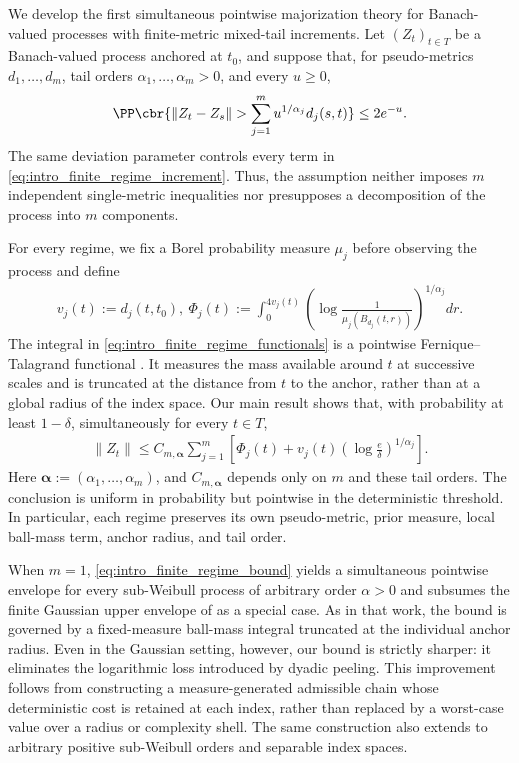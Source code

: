 \documentclass[11pt]{article}
\begin{document}
We develop the first simultaneous pointwise majorization theory for
Banach-valued processes with finite-metric mixed-tail
increments. Let
$(Z_t)_{t\in T}$ be a Banach-valued process anchored at $t_0$, and
suppose that, for pseudo-metrics $d_1,\ldots,d_m$, tail orders
$\alpha_1,\ldots,\alpha_m>0$, and every $u\ge0$,
\begin{align}
\PP\cbr{
\|Z_t-Z_s\|>
\sum_{j=1}^m u^{1/\alpha_j}d_j(s,t)
}
\le 2e^{-u}.
\label{eq:intro_finite_regime_increment}
\end{align}
The same deviation parameter controls every term in
\eqref{eq:intro_finite_regime_increment}. Thus, the assumption neither
imposes $m$ independent single-metric inequalities nor presupposes a
decomposition of the process into $m$ components.

For every regime, we fix a Borel probability measure $\mu_j$ before
observing the process and define
\begin{align}
v_j(t):=d_j(t,t_0),\ 
\Phi_j(t):=
\int_0^{4v_j(t)}
\left(
\log\frac{1}{\mu_j(B_{d_j}(t,r))}
\right)^{1/\alpha_j}dr.
\label{eq:intro_finite_regime_functionals}
\end{align}
The integral in \eqref{eq:intro_finite_regime_functionals} is a
pointwise Fernique–Talagrand functional \citep{xu2026}. It measures the mass available
around $t$ at successive scales and is truncated at the distance from
$t$ to the anchor, rather than at a global radius of the index space.
Our main result shows that, with probability at least $1-\delta$,
simultaneously for every $t\in T$,
\begin{align}
\|Z_t\|
\le
C_{m,\boldsymbol\alpha}
\sum_{j=1}^m
\left[
\Phi_j(t)
+
v_j(t)
\left(\log\frac{e}{\delta}\right)^{1/\alpha_j}
\right].
\label{eq:intro_finite_regime_bound}
\end{align}
Here $\boldsymbol\alpha:=(\alpha_1,\ldots,\alpha_m)$, and
$C_{m,\boldsymbol\alpha}$ depends only on $m$ and these tail orders.
The conclusion is uniform in probability but pointwise in the
deterministic threshold. In particular, each regime preserves its own
pseudo-metric, prior measure, local ball-mass term, anchor radius,
and tail order.

When $m=1$, \eqref{eq:intro_finite_regime_bound} yields a simultaneous
pointwise envelope for every sub-Weibull process of arbitrary order
$\alpha>0$ and subsumes the finite Gaussian upper envelope of
\citet{xu2026} as a special case. As in that work, the bound is governed
by a fixed-measure ball-mass integral truncated at the individual anchor
radius. Even in the Gaussian setting, however, our bound is strictly
sharper: it eliminates the logarithmic loss introduced by dyadic peeling.
This improvement follows from constructing a measure-generated admissible
chain whose deterministic cost is retained at each index, rather than
replaced by a worst-case value over a radius or complexity shell. The same
construction also extends to arbitrary positive sub-Weibull
orders and separable index spaces.
\end{document}
